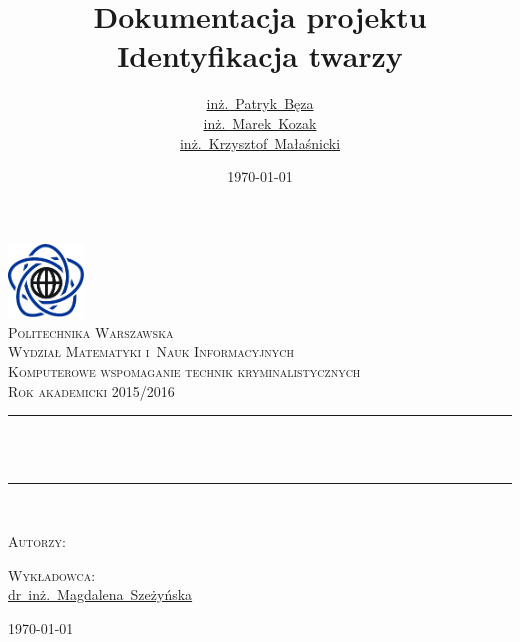 \documentclass[a4paper,titlepage]{article}
\title{Dokumentacja projektu\\[0.6em]Identyfikacja twarzy}
\author{
    \href{mailto:bezap@student.mini.pw.edu.pl}{inż.~Patryk~Bęza}\\[0.7em]
    \href{mailto:kozakm@student.mini.pw.edu.pl}{inż.~Marek~Kozak}\\[0.7em]
    \href{mailto:malasnickik@student.mini.pw.edu.pl}{inż.~Krzysztof~Małaśnicki}\\[0.7em]
}
\date{\today}
\newcommand\blankpage{%
	\null
	\thispagestyle{empty}%
	\addtocounter{page}{-1}%
	\newpage}
\theoremstyle{break}
\numberwithin{equation}{subsection}
\begin{document}
\makeatletter
\renewcommand{\ALG@name}{Algorytm}
\begin{titlepage}
\newcommand{\HRule}{\rule{\linewidth}{0.5mm}}
\center

\includegraphics[width=2.0cm]{img/mini}\\[1.5cm]
\textsc{\LARGE Politechnika Warszawska}\\[0.3cm]
\textsc{\Large Wydział Matematyki i~Nauk Informacyjnych}\\[1.5cm]
\textsc{\large Komputerowe wspomaganie technik kryminalistycznych}\\[0.2cm]
\textsc{\small Rok akademicki 2015/2016}\\[1.5cm]

\HRule \\[0.7cm]
{ \huge \bfseries \@title}\\[0.7cm]
\HRule \\[1.75cm]

\begin{minipage}[t]{0.4\textwidth}
\begin{flushleft}\large
\textsc{Autorzy:}\\[3mm]
\@author
\end{flushleft}
\end{minipage}
\begin{minipage}[t]{0.4\textwidth}
\begin{flushright}\large
\textsc{Wykładowca:}\\[3mm]
\href{mailto:m.szezynska@ise.pw.edu.pl}{dr~inż.~Magdalena~Szeżyńska}\\[1cm]
\end{flushright}
\end{minipage}
\vfill
{\large \today}

\end{titlepage}

\blankpage
\tableofcontents
\clearpage
\blankpage

\end{document}
